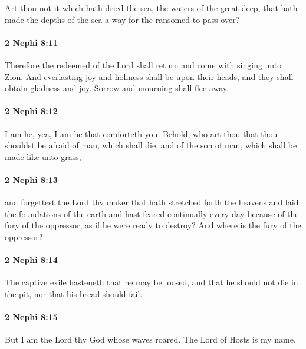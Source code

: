 			Art thou not it which hath dried the sea,
			the waters of the great deep,
			that hath made the depths of the sea a way
			for the ransomed to pass over?

		\paragraph{2 Nephi 8:11} %
			\label{2NEPHI-8-11}

			Therefore the redeemed of the Lord shall return
			and come with singing unto Zion.
			And everlasting joy and holiness shall be upon their heads,
			and they shall obtain gladness and joy.
			Sorrow and mourning shall flee away.

		\paragraph{2 Nephi 8:12} %
			\label{2NEPHI-8-12}

			I am he, yea, I am he that comforteth you.
			Behold, who art thou that thou shouldst be afraid of man, which shall die,
			and of the son of man, which shall be made like unto grass,

		\paragraph{2 Nephi 8:13} %
			\label{2NEPHI-8-13}

			and forgettest the Lord thy maker
			that hath stretched forth the heavens and laid the foundations of the earth
			and hast feared continually every day because of the fury of the oppressor,
			as if he were ready to destroy?
			And where is the fury of the oppressor?

		\paragraph{2 Nephi 8:14} %
			\label{2NEPHI-8-14}

			The captive exile hasteneth that he may be loosed,
			and that he should not die in the pit, nor that his bread should fail.

		\paragraph{2 Nephi 8:15} %
			\label{2NEPHI-8-15}

			But I am the Lord thy God whose waves roared.
			The Lord of Hosts is my name.

